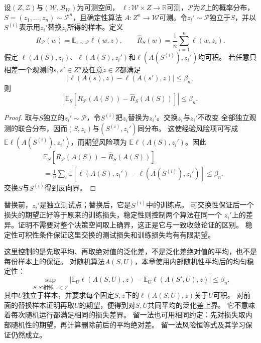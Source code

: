\begin{theorem}[均匀稳定性与期望风险]
\label{thm:stability-expected-generalization}
设$(Z,\mathcal Z)$与$(\mathcal W,\mathcal B_{\mathcal W})$为可测空间，
$\ell:\mathcal W\times Z\to\mathbb R$可测，$\mathcal P$为$Z$上的概率分布，
$S=(z_1,\ldots,z_n)\sim\mathcal P^n$，且确定性算法
$A:Z^n\to\mathcal W$可测。令$z_i'\sim\mathcal P$独立于$S$，并以
$S^{(i)}$表示用$z_i'$替换$z_i$所得的样本。定义
\[
 R_{\mathcal P}(w)=\mathbb E_{z\sim\mathcal P}\ell(w,z),
 \qquad
 \hat R_S(w)=\frac1n\sum_{i=1}^n\ell(w,z_i).
\]
假定
$\ell(A(S),z_i)$、$\ell(A(S),z_i')$和$\ell(A(S^{(i)}),z_i')$均可积。
若任意只相差一个观测的$s,s'\in Z^n$及任意$z\in Z$都满足
\[
 |\ell(A(s),z)-\ell(A(s'),z)|\leq\beta_n,
\]
则
\begin{equation}
 \left|\mathbb E_S\left[R_{\mathcal P}(A(S))-\hat R_S(A(S))\right]\right|
 \leq\beta_n.
 \label{eq:stability-expectation-bound}
\end{equation}
\end{theorem}

\begin{proof}
取与$S$独立的$z_i'\sim\mathcal P$，令$S^{(i)}$把$z_i$替换为$z_i'$。交换$z_i$与$z_i'$不改变
全部独立观测的联合分布，因而$(S,z_i)$与$(S^{(i)},z_i')$同分布。
这使经验风险项可写成$\mathbb E\ell(A(S^{(i)}),z_i')$，而期望风险项为
$\mathbb E\ell(A(S),z_i')$。因此
\begin{align*}
 &\mathbb E_S[R_{\mathcal P}(A(S))-\hat R_S(A(S))]\\
 &=\frac1n\sum_i\mathbb E
   [\ell(A(S),z_i')-\ell(A(S^{(i)}),z_i')]
 \leq\beta_n.
\end{align*}
交换$S$与$S^{(i)}$得到反向界。

\end{proof}

替换前，$z_i'$是独立测试点；替换后，它是$S^{(i)}$中的训练点。
可交换性保证后一个损失的期望正好等于原来的训练损失，稳定性则控制两个算法在同一个
$z_i'$上的差异。证明不需要对整个决策空间取上确界，这正是它与一致收敛论证的区别。
稳定性可积性条件保证这里交换的测试损失和训练损失均有有限期望。

这里控制的是先取平均、再取绝对值的泛化差，不是泛化差绝对值的平均，也不是每份样本上的保证。
对随机算法$A(S,U)$，本章使用内部随机性平均后的均匀稳定性：
\[
 \sup_{S,S'\text{相邻},\,z\in Z}
 \left|\mathbb E_U\ell(A(S,U),z)-\mathbb E_U\ell(A(S',U),z)\right|\leq\beta_n.
\]
其中$U$独立于样本，并要求每个固定$S,z$下的$\ell(A(S,U),z)$关于$U$可积。
对前面的替换样本证明再取$U$的期望，便得到对$S,U$共同平均的泛化差上界。
它不意味着每次随机运行都满足相同的损失差界。
留一法也可用相同约定：先对损失取内部随机性的期望，再计算删除前后的平均绝对差。
留一法风险恒等式及其学习保证仍然成立。


